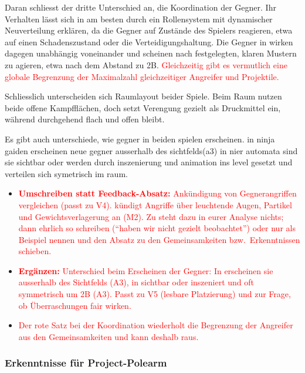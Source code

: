 \documentclass[../Main.tex]{subfiles}
\begin{document}
Daran schliesst der dritte Unterschied an, die Koordination der Gegner. Ihr Verhalten lässt sich in  am besten durch ein Rollensystem mit dynamischer Neuverteilung erklären, da die Gegner auf Zustände des Spielers reagieren, etwa auf einen Schadenszustand oder die Verteidigungshaltung. Die Gegner in  wirken dagegen unabhängig voneinander und scheinen nach festgelegten, klaren Mustern zu agieren, etwa nach dem Abstand zu 2B. \textcolor{red}{Gleichzeitig gibt es vermutlich eine globale Begrenzung der Maximalzahl gleichzeitiger Angreifer und Projektile.}

Schliesslich unterscheiden sich Raumlayout beider Spiele. Beim Raum nutzen beide offene Kampfflächen, doch  setzt Verengung gezielt als Druckmittel ein, während  durchgehend flach und offen bleibt.

Es gibt auch unterschiede, wie gegner in beiden spielen erscheinen. in ninja gaiden erscheinen neue gegner ausserhalb des sichtfelds(a3) in nier automata sind sie sichtbar oder werden durch inszenierung und animation ins level gesetzt und verteilen sich symetrisch im raum.

\begin{itemize}[leftmargin=1.5cm]
    \item \textcolor{red}{\textbf{Umschreiben statt Feedback-Absatz:} Ankündigung von Gegnerangriffen vergleichen (passt zu V4).  kündigt Angriffe über leuchtende Augen, Partikel und Gewichtsverlagerung an (M2). Zu  steht dazu in eurer Analyse nichts; dann ehrlich so schreiben (\enquote{haben wir nicht gezielt beobachtet}) oder nur  als Beispiel nennen und den Absatz zu den Gemeinsamkeiten bzw.\ Erkenntnissen schieben.}
    \item \textcolor{red}{\textbf{Ergänzen:} Unterschied beim Erscheinen der Gegner: In  erscheinen sie ausserhalb des Sichtfelds (A3), in  sichtbar oder inszeniert und oft symmetrisch um 2B (A3). Passt zu V5 (lesbare Platzierung) und zur Frage, ob Überraschungen fair wirken.}
    \item \textcolor{red}{Der rote Satz bei der Koordination wiederholt die Begrenzung der Angreifer aus den Gemeinsamkeiten und kann deshalb raus.}
\end{itemize}

\subsubsection{Erkenntnisse für Project-Polearm}
\end{document}
